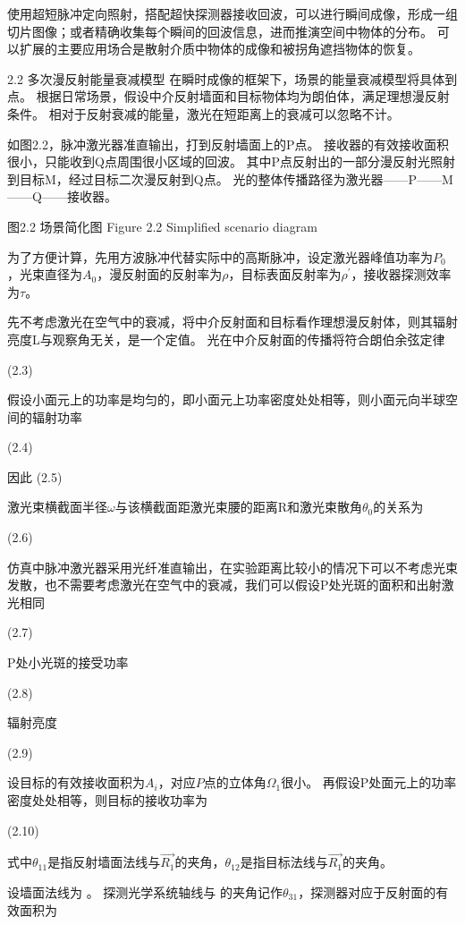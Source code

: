 使用超短脉冲定向照射，搭配超快探测器接收回波，可以进行瞬间成像，形成一组切片图像；或者精确收集每个瞬间的回波信息，进而推演空间中物体的分布。
可以扩展的主要应用场合是散射介质中物体的成像和被拐角遮挡物体的恢复。

2.2  多次漫反射能量衰减模型
在瞬时成像的框架下，场景的能量衰减模型将具体到点。
根据日常场景，假设中介反射墙面和目标物体均为朗伯体，满足理想漫反射条件。
相对于反射衰减的能量，激光在短距离上的衰减可以忽略不计。

如图2.2，脉冲激光器准直输出，打到反射墙面上的P点。
接收器的有效接收面积很小，只能收到Q点周围很小区域的回波。
其中P点反射出的一部分漫反射光照射到目标M，经过目标二次漫反射到Q点。
光的整体传播路径为激光器——P——M——Q——接收器。

 
图2.2  场景简化图
Figure 2.2 Simplified scenario diagram

为了方便计算，先用方波脉冲代替实际中的高斯脉冲，设定激光器峰值功率为$P_0$，光束直径为$A_0$，漫反射面的反射率为$\rho$，目标表面反射率为$\rho^\prime$，接收器探测效率为$\tau$。

先不考虑激光在空气中的衰减，将中介反射面和目标看作理想漫反射体，则其辐射亮度L与观察角无关，是一个定值。
光在中介反射面的传播将符合朗伯余弦定律

	  	(2.3)

假设小面元上的功率是均匀的，即小面元上功率密度处处相等，则小面元向半球空间的辐射功率

	  	(2.4)

因此
	  	(2.5)

激光束横截面半径$\omega$与该横截面距激光束腰的距离R和激光束散角$\theta_0$的关系为

	  	(2.6)

仿真中脉冲激光器采用光纤准直输出，在实验距离比较小的情况下可以不考虑光束发散，也不需要考虑激光在空气中的衰减，我们可以假设P处光斑的面积和出射激光相同

	  	(2.7)

P处小光斑的接受功率

	  	(2.8)

辐射亮度

	   	(2.9)

设目标的有效接收面积为$A_i$，对应$P$点的立体角$\Omega_1$很小。
再假设P处面元上的功率密度处处相等，则目标的接收功率为

	  	(2.10)

式中$\theta_{11}$是指反射墙面法线与$\vec{R_1}$的夹角，$\theta_{12}$是指目标法线与$\vec{R_1}$的夹角。

设墙面法线为 。
探测光学系统轴线与 的夹角记作$\theta_{31}$，探测器对应于反射面的有效面积为


